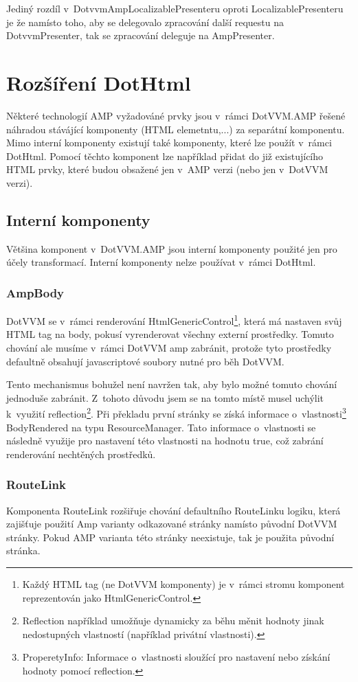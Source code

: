 Jediný rozdíl v~DotvvmAmpLocalizablePresenteru oproti LocalizablePresenteru je že namísto toho, aby se delegovalo zpracování další requestu na DotvvmPresenter, tak se zpracování deleguje na AmpPresenter.

\section{Rozšíření DotHtml}

Některé technologií AMP vyžadováné prvky jsou v~rámci DotVVM.AMP řešené náhradou stávájící komponenty (HTML elemetntu,...) za separátní komponentu.  Mimo interní komponenty existují také komponenty, které lze použít v~rámci DotHtml. Pomocí těchto komponent lze například přidat do již existujícího HTML prvky, 
 které budou obsažené jen v~AMP verzi (nebo jen v~DotVVM verzi).
 
\subsection*{Interní komponenty}
Většina komponent v~DotVVM.AMP jsou interní komponenty použité jen pro účely transformací. Interní komponenty nelze používat v~rámci DotHtml.

\subsubsection*{AmpBody}
DotVVM se v~rámci renderování HtmlGenericControl\footnote{Každý HTML tag (ne DotVVM komponenty) je v~rámci stromu komponent reprezentován jako HtmlGenericControl.}, která má nastaven svůj HTML tag na body, pokusí vyrenderovat všechny externí prostředky. Tomuto chování ale musíme v~rámci DotVVM amp zabránit, protože tyto prostředky defaultně obsahují javascriptové soubory nutné pro běh DotVVM.

Tento mechanismus bohužel není navržen tak, aby bylo možné tomuto chování jednoduše zabránit. Z~tohoto důvodu jsem se na tomto místě musel uchýlit k~využití reflection\footnote{Reflection například umožňuje dynamicky za běhu měnit hodnoty jinak nedostupných vlastností (například privátní vlastnosti).}. Při překladu první stránky se získá informace o~vlastnosti\footnote{ProperetyInfo: Informace o~vlastnosti sloužící pro nastavení nebo získání hodnoty pomocí reflection.} BodyRendered na typu ResourceManager. Tato informace o~vlastnosti se následně využije pro nastavení této vlastnosti na hodnotu true, což zabrání renderování nechtěných prostředků.

\subsubsection*{RouteLink}
Komponenta RouteLink rozšiřuje chování defaultního RouteLinku logiku, která zajišťuje použití Amp varianty odkazované stránky namísto původní DotVVM stránky. Pokud AMP varianta této stránky neexistuje, tak je použita původní stránka.

